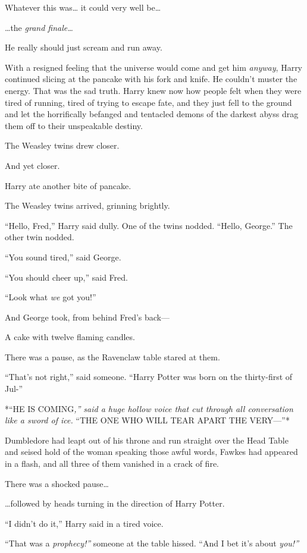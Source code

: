 Whatever this was\ldots{} it could very well be\ldots{}

\ldots{}the \emph{grand finale\ldots{}}

He really should just scream and run away.

With a resigned feeling that the universe would come and get him
\emph{anyway}, Harry continued slicing at the pancake with his fork and
knife. He couldn't muster the energy. That was the sad truth. Harry knew
now how people felt when they were tired of running, tired of trying to
escape fate, and they just fell to the ground and let the horrifically
befanged and tentacled demons of the darkest abyss drag them off to
their unspeakable destiny.

The Weasley twins drew closer.

And yet closer.

Harry ate another bite of pancake.

The Weasley twins arrived, grinning brightly.

``Hello, Fred,'' Harry said dully. One of the twins nodded. ``Hello,
George.'' The other twin nodded.

``You sound tired,'' said George.

``You should cheer up,'' said Fred.

``Look what \emph{we} got you!''

And George took, from behind Fred's back---

A cake with twelve flaming candles.

There was a pause, as the Ravenclaw table stared at them.

``That's not right,'' said someone. ``Harry Potter was born on the
thirty-first of Jul-''

*``HE IS COMING\emph{,'' said a huge hollow voice that cut through all
conversation like a sword of ice. }``THE ONE WHO WILL TEAR APART THE
VERY---''*

Dumbledore had leapt out of his throne and run straight over the Head
Table and seised hold of the woman speaking those awful words, Fawkes
had appeared in a flash, and all three of them vanished in a crack of
fire.

There was a shocked pause\ldots{}

\ldots{}followed by heads turning in the direction of Harry Potter.

``I didn't do it,'' Harry said in a tired voice.

``That was a \emph{prophecy!''} someone at the table hissed. ``And I bet
it's about \emph{you!''}

